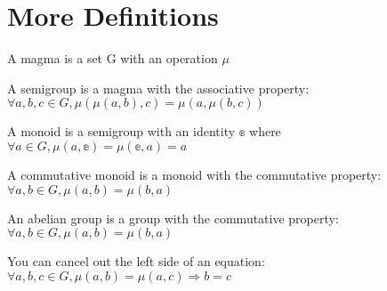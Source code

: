 \section{More Definitions}

\begin{definition}[Magma]
    \label{definition : Magma}
    \leanok
    A magma is a set G with an operation $\mu$
\end{definition}

\begin{definition}[Semigroup]
    \label{definition : Semigroup}
    \leanok
    A semigroup is a magma with the associative property: $\forall a, b, c \in G, \mu(\mu(a, b), c) = \mu(a, \mu(b, c))$
\end{definition}

\begin{definition}[Monoid]
    \label{definition : Monoid}
    \leanok
    A monoid is a semigroup with an identity $\mathbb{e}$ where $\forall a \in G, \mu (a, \mathbb{e}) = \mu(\mathbb{e}, a) = a$
\end{definition}

\begin{definition}
    \label{definition : CommMonoid}
    \leanok
    A commutative monoid is a monoid with the commutative property: $\forall a, b \in G, \mu(a, b) = \mu(b, a)$
\end{definition}

\begin{definition}
    \label{definition : AbelianGroup}
    \leanok
    An abelian group is a group with the commutative property: $\forall a, b \in G, \mu(a, b) = \mu(b, a)$
\end{definition}

\begin{theorem}
    \label{definition : left_cancel}
    \leanok
    You can cancel out the left side of an equation:
    $\forall a, b, c \in G, \mu(a, b) = \mu(a, c) \Rightarrow b = c$
\end{theorem}
